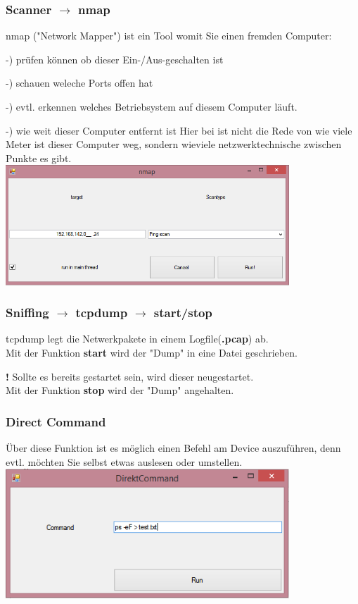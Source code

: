 \documentclass[11pt]{article} %
\begin{document}
\subsubsection{Scanner $\rightarrow$ nmap}
nmap ("Network Mapper") ist ein Tool womit Sie einen fremden Computer:

-) prüfen können ob dieser Ein-/Aus-geschalten ist

-) schauen weleche Ports offen hat

-) evtl. erkennen welches Betriebsystem auf diesem Computer läuft.

-) wie weit dieser Computer entfernt ist
Hier bei ist nicht die Rede von wie viele Meter ist dieser Computer weg, sondern wieviele netzwerktechnische zwischen Punkte es gibt.\\
\includegraphics[width=0.8\textwidth]{nmap}
\subsubsection{Sniffing $\rightarrow$ tcpdump $\rightarrow$ start/stop}
tcpdump legt die Netwerkpakete in einem Logfile(\textbf{.pcap}) ab. \\
Mit der Funktion \textbf{start} wird der "Dump" in eine Datei geschrieben.

\textbf{!} Sollte es bereits gestartet sein, wird dieser neugestartet.\\
Mit der Funktion \textbf{stop} wird der "Dump" angehalten. \\
\pagebreak
\subsubsection{Direct Command}
Über diese Funktion ist es möglich einen Befehl am Device auszuführen, denn evtl. möchten Sie selbst etwas auslesen oder umstellen.\\
\includegraphics[width=0.8\textwidth]{direct_cmd}
\pagebreak
\end{document}

